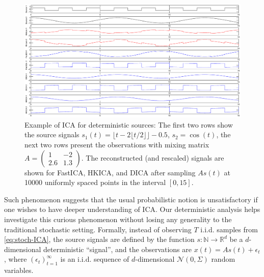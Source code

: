 \documentclass{article}
\newcommand{\ra}{\rightarrow}
\newcommand{\real}{\mathbb{R}}
\renewcommand{\natural}{\mathbb{N}}
\newcommand{\iid}{i.i.d.\xspace}
\theoremstyle{definition}
\begin{document}
\begin{figure}[pt]
\label{fig:demo}
\centering
	\includegraphics[width = \linewidth]{demo}
\caption{Example of ICA for deterministic sources: The first two rows show the source signals $s_1(t)=\lfloor t-2\lfloor t/2 \rfloor \rfloor-0.5$, $s_2=\cos(t)$, the next two rows present the observations with mixing matrix $A=\left(\begin{array}{cc}1&-2\\2.6&1.3\end{array}\right)$. The reconstructed (and rescaled) signals are shown for FastICA, HKICA, and DICA after sampling $As(t)$ at 10000 uniformly spaced points in the interval $[0,15]$.}
\end{figure}

Such phenomenon suggests that the usual probabilistic notion is unsatisfactory if one wishes to have deeper understanding of ICA.   
Our deterministic analysis helps investigate this curious phenomenon without losing any generality to the traditional stochastic setting. Formally, instead of observing $T$ \iid samples from \eqref{eq:stoch-ICA}, the source signals are defined by the function $s:\natural \ra \real^d$ be a $d$-dimensional deterministic ``signal'', and
the observations are $x(t)=A s(t) +\epsilon_t$, where $(\epsilon_t)_{t=1}^\infty$ is an \iid sequence of $d$-dimensional $\mathcal{N}(0,\Sigma)$ random variables.

\end{document}

